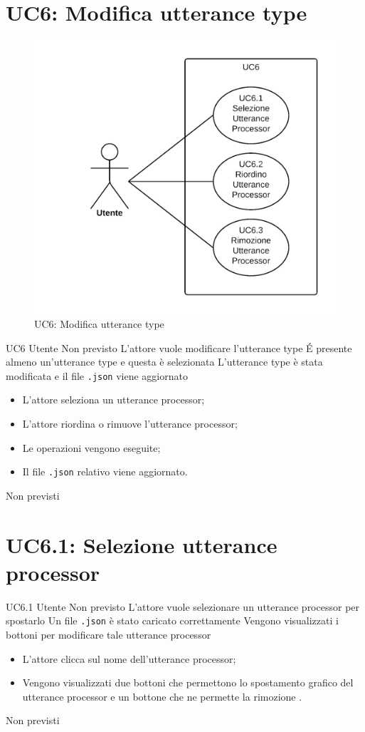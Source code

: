 \documentclass[../AnalisideiRequisiti.tex]{subfiles}
\begin{document}
\section{UC6: Modifica utterance type}
\begin{figure}[H]
	\centering
	\includegraphics[width=\textwidth]{../img/UC6.png}
	\caption{UC6: Modifica utterance type}
\end{figure}
\UserCase
{UC6}
{Utente}
{Non previsto}
{L'attore vuole modificare l'utterance type}
{\'E presente almeno un'utterance type e questa è selezionata }
{L'utterance type è stata modificata e il file \verb|.json| viene aggiornato}
{
	\begin{itemize}
		\item{} L'attore seleziona un utterance processor;
		\item{} L'attore riordina o rimuove l'utterance processor;	
		\item{} Le operazioni vengono eseguite;
		\item{} Il file \verb|.json| relativo viene aggiornato.	
	\end{itemize}
}
{Non previsti}

\section{UC6.1: Selezione utterance processor}
\UserCase
{UC6.1}
{Utente}
{Non previsto}
{L'attore vuole selezionare un utterance processor per spostarlo}
{Un file \verb|.json| è stato caricato correttamente }
{Vengono visualizzati i bottoni per modificare tale utterance processor}
{
	\begin{itemize}
		\item{} L'attore clicca sul nome dell'utterance processor;
		\item{} Vengono visualizzati due bottoni che permettono lo spostamento grafico del utterance processor  e un bottone che ne permette la rimozione . 		
	\end{itemize}
}
{Non previsti}
\end{document}
